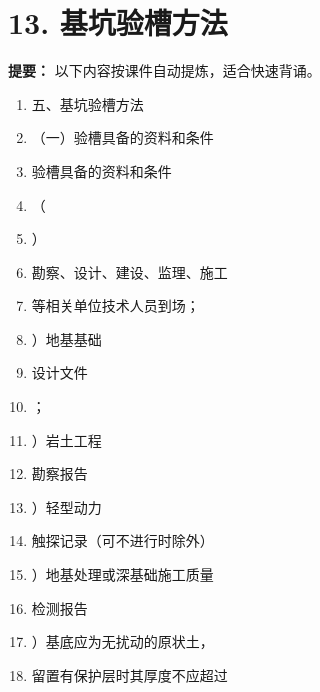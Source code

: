 \documentclass[UTF8,fontset=fandol,11pt]{ctexart}
\begin{document}
\newpage

\section*{13. 基坑验槽方法}


\begin{mainbox}

\textbf{提要：} 以下内容按课件自动提炼，适合快速背诵。

\end{mainbox}

\begin{enumerate}[label=\arabic*.]

\item 五、基坑验槽方法

\item （一）验槽具备的资料和条件

\item 验槽具备的资料和条件

\item （

\item ）

\item 勘察、设计、建设、监理、施工

\item 等相关单位技术人员到场；

\item ）地基基础

\item 设计文件

\item ；

\item ）岩土工程

\item 勘察报告

\item ）轻型动力

\item 触探记录（可不进行时除外）

\item ）地基处理或深基础施工质量

\item 检测报告

\item ）基底应为无扰动的原状土，

\item 留置有保护层时其厚度不应超过


\end{enumerate}
\end{document}
